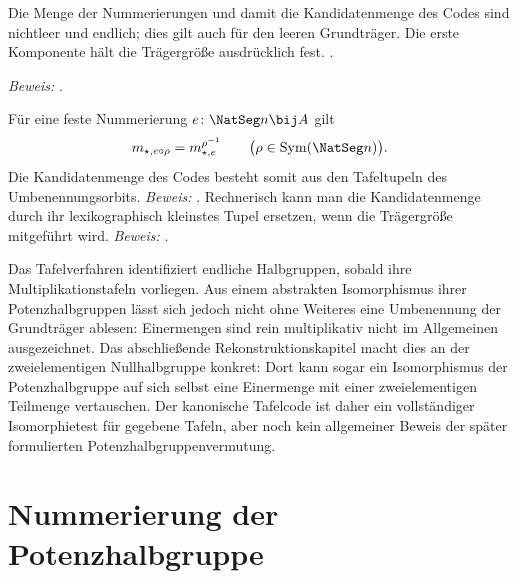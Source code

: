\documentclass[main.tex]{subfiles}
\begin{document}
Die Menge der Nummerierungen und damit die Kandidatenmenge des Codes
sind nichtleer und endlich; dies gilt auch für den leeren Grundträger.
Die erste Komponente hält die Trägergröße ausdrücklich fest.
.

\noindent\emph{Beweis:} .

Für eine feste Nummerierung \(e\colon\NatSeg n\bij A\) gilt
\[
  m_{\star,e\circ\rho}=m_{\star,e}^{\rho^{-1}}
  \qquad\bigl(\rho\in\operatorname{Sym}(\NatSeg n)\bigr).
\]
Die Kandidatenmenge des Codes besteht somit aus den Tafeltupeln des
Umbenennungsorbits.
\noindent\emph{Beweis:} .
Rechnerisch kann man die Kandidatenmenge durch ihr lexikographisch
kleinstes Tupel ersetzen, wenn die Trägergröße mitgeführt wird.
\noindent\emph{Beweis:} .

\begin{remark}
Das Tafelverfahren identifiziert endliche Halbgruppen, sobald ihre
Multiplikationstafeln vorliegen.  Aus einem abstrakten Isomorphismus ihrer
Potenzhalbgruppen lässt sich jedoch nicht ohne Weiteres eine Umbenennung der
Grundträger ablesen: Einermengen sind rein multiplikativ nicht im
Allgemeinen ausgezeichnet.  Das abschließende Rekonstruktionskapitel macht
dies an der zweielementigen Nullhalbgruppe konkret: Dort kann sogar ein
Isomorphismus der Potenzhalbgruppe auf sich selbst eine Einermenge mit einer
zweielementigen Teilmenge vertauschen.  Der kanonische Tafelcode ist daher
ein vollständiger Isomorphietest für gegebene Tafeln, aber noch kein
allgemeiner Beweis der später formulierten Potenzhalbgruppenvermutung.
\end{remark}

\section{Nummerierung der Potenzhalbgruppe}
\end{document}
